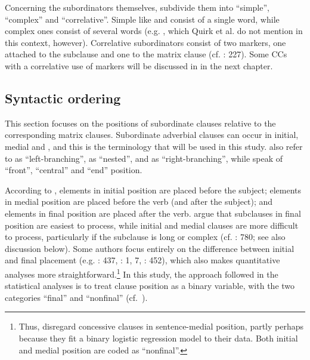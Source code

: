 Concerning the subordinators themselves, \citet[998–999]{QuirkEtAl1985} subdivide them into “simple”, “complex” and “correlative”. Simple  like  and  consist of a single word, while complex ones consist of several words (e.g. , which Quirk et al. do not mention in this context, however). Correlative subordinators consist of two markers, one attached to the subclause and one to the matrix clause (cf. \citealt{Rudolph1996}: 227). Some CCs with a correlative use of markers will be discussed in  in the next chapter.

\subsection{\label{bkm:Ref487447653}Syntactic ordering}\label{sec:2.3.1}\largerpage

This section focuses on the positions of subordinate clauses relative to the corresponding matrix clauses. Subordinate adverbial clauses can occur in initial, medial and , and this is the terminology that will be used in this study. \citet[1037]{QuirkEtAl1985} also refer to  as “left-branching”,  as “nested”, and  as “right-branching”, while   \citet[779]{HuddlestonPullum2002} speak of “front”, “central” and “end” position.

According to \citet[780]{HuddlestonPullum2002}, elements in initial position are placed before the subject; elements in medial position are placed before the verb (and after the subject); and elements in final position are placed after the verb. \citet[1039–1040]{QuirkEtAl1985} argue that subclauses in final position are easiest to process, while initial and medial clauses are more difficult to process, particularly if the subclause is long or complex (cf. \citealt{HuddlestonPullum2002}: 780; see also discussion below). Some authors focus entirely on the difference between initial and final placement (e.g. \citealt{Chafe1984}: 437, \citealt{WiechmannKerz2013}: 1, 7, \citealt{Diessel2005}: 452), which also makes quantitative analyses more straightforward.\footnote{Thus, \citet[footnote 2]{WiechmannKerz2013} disregard concessive clauses in sentence-medial position, partly perhaps because they fit a binary logistic regression model to their data. Both initial and medial position are coded as “nonfinal”.} In this study, the approach followed in the statistical analyses is to treat clause position as a binary variable, with the two categories “final” and “nonfinal” (cf.~).

